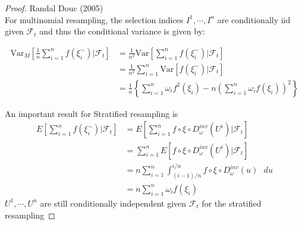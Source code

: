 \documentclass[11pt,a4,twosided,singlespacing,titlepagenumber=on]{scrreprt}
\numberwithin{equation}{chapter} %
\theoremstyle{remark}
\begin{document}
\begin{proof}
Randal Douc (2005) \\
For multinomial resampling, the selection indices $I^1,\cdots,I^n$ are conditionally iid given $\mathcal{F}_t$ and thus the conditional variance is given by:

\begin{align*}
\text{Var}_M \left[ \frac{1}{n} \sum_{i=1}^n f(\xi_i^\sim) \bigg| \mathcal{F}_t \right] &= \frac{1}{n^2} \text{Var} \left[ \sum_{i=1}^n f(\xi_i^\sim) \bigg| \mathcal{F}_t \right] \\
																					  &= \frac{1}{n^2} \sum_{i=1}^n \text{Var} \left[ f(\xi_i^\sim) \bigg| \mathcal{F}_t \right] \\
																					  &= \frac{1}{n} \left\{\sum_{i=1}^n \omega_i f^2(\xi_i) - n \left(\sum_{i=1}^n \omega_i f(\xi_i)\right)^2\right\}
\end{align*}

An important result for Stratified resampling is
\begin{align*}
E \left[ \sum_{i=1}^n f(\xi_i^\sim)  \bigg| \mathcal{F}_t \right] &= E \left[ \sum_{i=1}^n f \circ \xi \circ D_\omega^{inv}(U^i) \bigg| \mathcal{F}_t \right] \\
																  &= \sum_{i=1}^n E \left[ f \circ \xi \circ D_\omega^{inv}(U^i) \bigg| \mathcal{F}_t \right] \\
																  &= n \sum_{i=1}^n \int_{(i-1)/n}^{i/n} f \circ \xi \circ D_\omega^{inv}(u)\text{ }du \\
																  &= n \sum_{i=1}^n \omega_i f(\xi_i)
\end{align*}
$U^1,\cdots,U^n$ are still conditionally independent given $\mathcal{F}_t$ for the stratified resampling



\end{proof}
\end{document}
